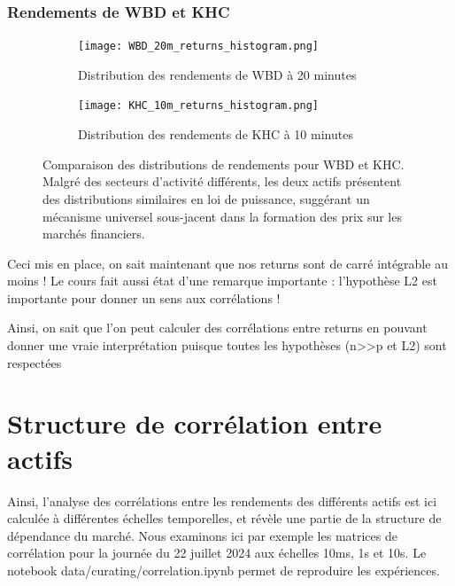 \documentclass[10pt,a4paper]{article}
\theoremstyle{definition}
\theoremstyle{remark}
\begin{document}
\begin{itemize}
\subsubsection{Rendements de WBD et KHC}

\begin{figure}[H]
    \centering
    \begin{subfigure}[b]{0.45\textwidth}
        \texttt{[image: WBD\_20m\_returns\_histogram.png]}
        \caption{Distribution des rendements de WBD à 20 minutes}
        \label{fig:WBD_20m_moved}
    \end{subfigure}
    \hfill
    \begin{subfigure}[b]{0.45\textwidth}
        \texttt{[image: KHC\_10m\_returns\_histogram.png]}
        \caption{Distribution des rendements de KHC à 10 minutes}
        \label{fig:KHC_10m_moved}
    \end{subfigure}
    \caption{Comparaison des distributions de rendements pour WBD et KHC. Malgré des secteurs d'activité différents, les deux actifs présentent des distributions similaires en loi de puissance, suggérant un mécanisme universel sous-jacent dans la formation des prix sur les marchés financiers.}
    \label{fig:WBD_KHC_returns_moved}
\end{figure}


Ceci mis en place, on sait maintenant que nos returns sont de carré intégrable au moins ! 
Le cours fait aussi état d'une remarque importante : l'hypothèse L2 est importante pour donner un sens aux corrélations !

Ainsi, on sait que l'on peut calculer des corrélations entre returns en pouvant donner une vraie interprétation puisque toutes les hypothèses (n>>p et L2) sont respectées

\newpage
\section{Structure de corrélation entre actifs}

Ainsi, l'analyse des corrélations entre les rendements des différents actifs est ici calculée à différentes échelles temporelles, et révèle une partie de la structure de dépendance du marché. 
Nous examinons ici par exemple les matrices de corrélation pour la journée du 22 juillet 2024 aux échelles 10ms, 1s et 10s. Le notebook data/curating/correlation.ipynb permet de reproduire les expériences.


\end{itemize}
\end{document}
